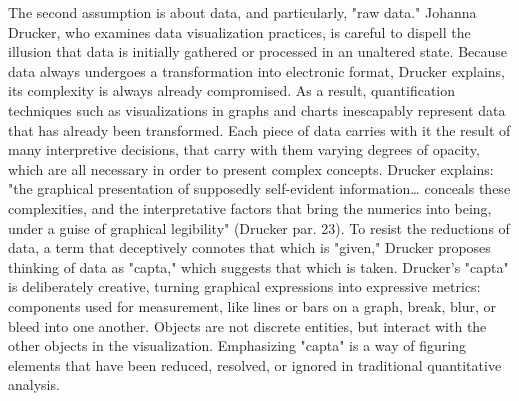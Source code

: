 \documentclass[11pt]{article}
\begin{document}
The second assumption is about data, and particularly, "raw data."
Johanna Drucker, who examines data visualization practices, is careful
to dispell the illusion that data is initially gathered or processed
in an unaltered state. Because data always undergoes a transformation
into electronic format, Drucker explains, its complexity is always
already compromised. As a result, quantification techniques such as
visualizations in graphs and charts inescapably represent data that
has already been transformed. Each piece of data carries with it the
result of many interpretive decisions, that carry with them varying
degrees of opacity, which are all necessary in order to present
complex concepts. Drucker explains: "the graphical presentation of
supposedly self-evident information\ldots{} conceals these complexities,
and the interpretative factors that bring the numerics into being,
under a guise of graphical legibility" (Drucker par. 23). To resist
the reductions of data, a term that deceptively connotes that which is
"given," Drucker proposes thinking of data as "capta," which suggests
that which is taken. Drucker's "capta" is deliberately creative,
turning graphical expressions into expressive metrics: components used
for measurement, like lines or bars on a graph, break, blur, or bleed
into one another. Objects are not discrete entities, but interact with
the other objects in the visualization. Emphasizing "capta" is a way
of figuring elements that have been reduced, resolved, or ignored in
traditional quantitative analysis.
\end{document}
